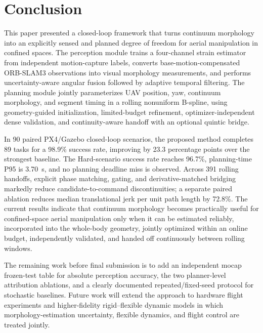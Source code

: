 \documentclass[journal,twoside]{IEEEtran}
\begin{document}
\section{Conclusion}
This paper presented a closed-loop framework that turns continuum morphology into an explicitly sensed and planned degree of freedom for aerial manipulation in confined spaces. The perception module trains a four-channel strain estimator from independent motion-capture labels, converts base-motion-compensated ORB-SLAM3 observations into visual morphology measurements, and performs uncertainty-aware angular fusion followed by adaptive temporal filtering. The planning module jointly parameterizes UAV position, yaw, continuum morphology, and segment timing in a rolling nonuniform B-spline, using geometry-guided initialization, limited-budget refinement, optimizer-independent dense validation, and continuity-aware handoff with an optional quintic bridge.

In 90 paired PX4/Gazebo closed-loop scenarios, the proposed method completes 89 tasks for a 98.9\% success rate, improving by 23.3 percentage points over the strongest baseline. The Hard-scenario success rate reaches 96.7\%, planning-time P95 is 3.70~s, and no planning deadline miss is observed. Across 391 rolling handoffs, explicit phase matching, gating, and derivative-matched bridging markedly reduce candidate-to-command discontinuities; a separate paired ablation reduces median translational jerk per unit path length by 72.8\%. The current results indicate that continuum morphology becomes practically useful for confined-space aerial manipulation only when it can be estimated reliably, incorporated into the whole-body geometry, jointly optimized within an online budget, independently validated, and handed off continuously between rolling windows.

The remaining work before final submission is to add an independent mocap frozen-test table for absolute perception accuracy, the two planner-level attribution ablations, and a clearly documented repeated/fixed-seed protocol for stochastic baselines. Future work will extend the approach to hardware flight experiments and higher-fidelity rigid--flexible dynamic models in which morphology-estimation uncertainty, flexible dynamics, and flight control are treated jointly.

\balance
% 
% 
\end{document}
